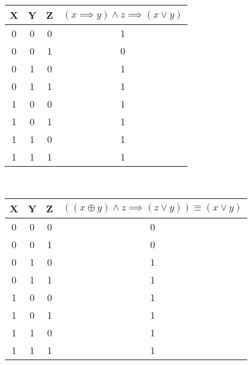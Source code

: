 \documentclass[a4paper,12pt]{report} %
\begin{document}
\begin{flushleft}
	\begin{multicols}{2}
		\begin{tabular}{ | c | c | c | c |}
			\hline
			X & Y & Z & $(x \implies y) \wedge z \implies (x \vee y)$ \\
			\hline
			0 & 0 & 0 & 1                                             \\
			\hline
			0 & 0 & 1 & 0                                             \\ 
			\hline
			0 & 1 & 0 & 1                                             \\
			\hline
			0 & 1 & 1 & 1                                             \\
			\hline
			1 & 0 & 0 & 1                                             \\
			\hline
			1 & 0 & 1 & 1                                             \\
			\hline
			1 & 1 & 0 & 1                                             \\
			\hline
			1 & 1 & 1 & 1                                             \\
			\hline
		\end{tabular} \\
		
		\begin{tabular}{ | c | c | c | c |}
			\hline
			X & Y & Z & $((x \oplus y) \wedge z \implies (z \vee y)) \equiv (x \vee y)$ \\
			\hline
			0 & 0 & 0 & 0                                                               \\
			\hline
			0 & 0 & 1 & 0                                                               \\ 
			\hline
			0 & 1 & 0 & 1                                                               \\
			\hline
			0 & 1 & 1 & 1                                                               \\
			\hline
			1 & 0 & 0 & 1                                                               \\
			\hline
			1 & 0 & 1 & 1                                                               \\
			\hline
			1 & 1 & 0 & 1                                                               \\
			\hline
			1 & 1 & 1 & 1                                                               \\
			\hline
		\end{tabular} \\
	\end{multicols}
	\bigskip
	

\end{flushleft}
\end{document}
